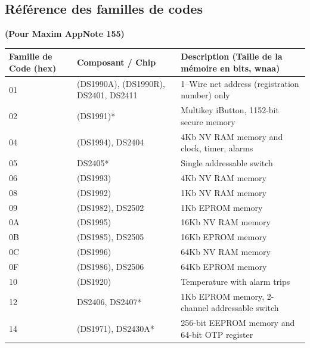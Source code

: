 
{
\subsection{Référence des familles de codes}
}
\textbf{(Pour Maxim AppNote 155)}

\begin{center}
\begin{tabular}{|p{}|p{}|p{}|}
\hline
\textbf{Famille de Code (hex)}
   & \textbf{Composant / Chip}            & \textbf{Description \newline (Taille de la mémoire en bits, wnaa)} \\ \hline
01 & (DS1990A), (DS1990R), DS2401, DS2411 & 1--Wire net address (registration number) only \\ \hline
02 & (DS1991)*                            & Multikey iButton, 1152-bit secure memory \\ \hline
04 & (DS1994), DS2404                     & 4Kb NV RAM memory and clock, timer, alarms \\ \hline
05 & DS2405*                              & Single addressable switch \\\hline
06 & (DS1993)                             & 4Kb NV RAM memory \\ \hline
08 & (DS1992)                             & 1Kb NV RAM memory \\ \hline
09 & (DS1982), DS2502                     & 1Kb EPROM memory \\ \hline
0A & (DS1995)                             & 16Kb NV RAM memory \\ \hline
0B & (DS1985), DS2505                     & 16Kb EPROM memory \\ \hline
0C & (DS1996)                             & 64Kb NV RAM memory \\ \hline
0F & (DS1986), DS2506                     & 64Kb EPROM memory \\ \hline
10 & (DS1920)                             & Temperature with alarm trips \\ \hline
12 & DS2406, DS2407*                      & 1Kb EPROM memory, 2-channel addressable switch \\ \hline
14 & (DS1971), DS2430A*                   & 256-bit EEPROM memory and 64-bit OTP register \\ \hline

\end{tabular}
\end{center}
